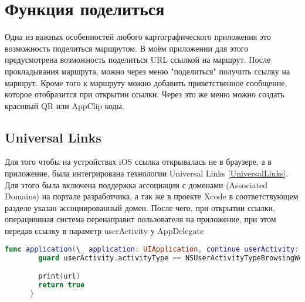\chapter{Функция поделиться}
  Одна из важных особенностей любого картографического приложения это возможность поделиться маршрутом. В моём приложении для этого предусмотрена возможность поделиться URL ссылкой на маршрут. После прокладывания маршрута, можно через меню "поделиться" получить ссылку на маршрут. Кроме того к маршруту можно добавить приветственное сообщение, которое отобразится при открытии ссылки. Через это же меню можно создать красивый QR или AppClip коды.

  \section{Universal Links}
    Для того чтобы на устройствах iOS ссылка открывалась не в браузере, а в приложение, была интегрирована технологии Universal Links \ref{UniversalLinks}. Для этого была включена поддержка ассоциации с доменами (Associated Domains) на портале разработчика, а так же в проекте Xcode в соответствующем разделе указан ассоциированный домен. После чего, при открытии ссылки, операционная система перенаправит пользователя на приложение, при этом передав ссылку в параметр userActivity у AppDelegate

    \begin{lstlisting}[language=swift,caption={-}]
    func application(\_ application: UIApplication, continue userActivity: NSUserActivity, restorationHandler: [Any?] -> Void) -> Bool {
        guard userActivity.activityType == NSUserActivityTypeBrowsingWeb, let url = userActivity.webpageURL else { return false }

        print(url)
        return true
      }
    \end{lstlisting}

